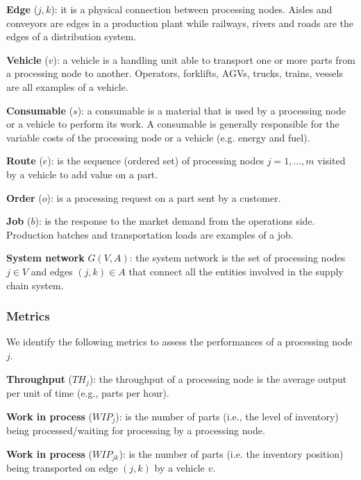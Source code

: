 \textbf{Edge} ($j,k$): it is a physical connection between processing nodes. Aisles and conveyors are edges in a production plant while railways, rivers and roads are the edges of a distribution system.\par

\textbf{Vehicle} ($v$): a vehicle is a handling unit able to transport one or more parts from a processing node to another. Operators, forklifts, AGVs, trucks, trains, vessels are all examples of a vehicle. \par

\textbf{Consumable} ($s$): a consumable is a material that is used by a processing node or a vehicle to perform its work. A consumable is generally responsible for the variable costs of the processing node or a vehicle (e.g. energy and fuel).\par

\textbf{Route} ($e$): is the sequence (ordered set) of processing nodes $j=1,\ldots,m$ visited by a vehicle to add value on a part.\par

\textbf{Order} ($o$): is a processing request on a part sent by a customer. \par

\textbf{Job} ($b$): is the response to the market demand from the operations side. Production batches and transportation loads are examples of a job.\par

\textbf{System network} $G(V,A)$: the system network is the set of processing nodes $j\in V$ and edges $\left(j,k\right)\in A$ that connect all the entities involved in the supply chain system.

\subsubsection{Metrics}
We identify the following metrics to assess the performances of a processing node $j$.\par

\textbf{Throughput} ($TH_{j}$): the throughput of a processing node is the average output per unit of time (e.g., parts per hour).\par

\textbf{Work in process} ($WIP_{j}$): is the number of parts (i.e., the level of inventory) being processed/waiting for processing by a processing node.\par

\textbf{Work in process} ($WIP_{jk}$): is the number of parts (i.e. the inventory position) being transported on edge $(j,k)$ by a vehicle $v$. \par

